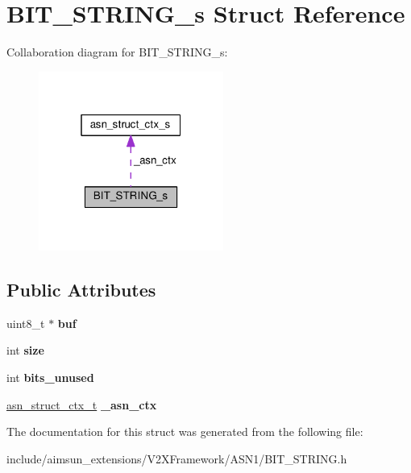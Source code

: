 \hypertarget{structBIT__STRING__s}{}\section{B\+I\+T\+\_\+\+S\+T\+R\+I\+N\+G\+\_\+s Struct Reference}
\label{structBIT__STRING__s}


Collaboration diagram for B\+I\+T\+\_\+\+S\+T\+R\+I\+N\+G\+\_\+s\+:\nopagebreak
\begin{figure}[H]
\begin{center}
\leavevmode
\includegraphics[width=172pt]{structBIT__STRING__s__coll__graph}
\end{center}
\end{figure}
\subsection*{Public Attributes}
\begin{DoxyCompactItemize}
\item 
uint8\+\_\+t $\ast$ {\bfseries buf}\hypertarget{structBIT__STRING__s_a0d46e66677df62aa11e24bda6a21af0c}{}\label{structBIT__STRING__s_a0d46e66677df62aa11e24bda6a21af0c}

\item 
int {\bfseries size}\hypertarget{structBIT__STRING__s_aeb19325975e1685c4dc3c5d63d3b788d}{}\label{structBIT__STRING__s_aeb19325975e1685c4dc3c5d63d3b788d}

\item 
int {\bfseries bits\+\_\+unused}\hypertarget{structBIT__STRING__s_a169280b5388fdd72e55d56950bedb46c}{}\label{structBIT__STRING__s_a169280b5388fdd72e55d56950bedb46c}

\item 
\hyperlink{structasn__struct__ctx__s}{asn\+\_\+struct\+\_\+ctx\+\_\+t} {\bfseries \+\_\+asn\+\_\+ctx}\hypertarget{structBIT__STRING__s_aa03d9b05132047959de41aa3acfdcabc}{}\label{structBIT__STRING__s_aa03d9b05132047959de41aa3acfdcabc}

\end{DoxyCompactItemize}


The documentation for this struct was generated from the following file\+:\begin{DoxyCompactItemize}
\item 
include/aimsun\+\_\+extensions/\+V2\+X\+Framework/\+A\+S\+N1/B\+I\+T\+\_\+\+S\+T\+R\+I\+N\+G.\+h\end{DoxyCompactItemize}
